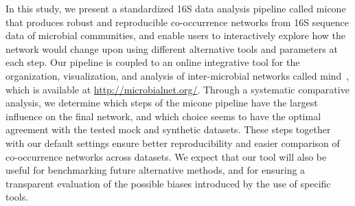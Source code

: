  In this study, we present a standardized 16S data analysis pipeline called \ac{micone} that produces robust and reproducible co-occurrence networks from 16S sequence data of microbial communities, and enable users to interactively explore how the network would change upon using different alternative tools and parameters at each step.
 Our pipeline is coupled to an online integrative tool for the organization, visualization, and analysis of inter-microbial networks called \ac{mind}~\cite{huResourceComparisonIntegration2022}, which is available at \href{http://microbialnet.org/}{http://microbialnet.org/}.
Through a systematic comparative analysis, we determine which steps of the \ac{micone} pipeline have the largest influence on the final network, and which choice seems to have the optimal agreement with the tested mock and synthetic datasets.
These steps together with our default settings ensure better reproducibility and easier comparison of co-occurrence networks across datasets.
We expect that our tool will also be useful for benchmarking future alternative methods, and for ensuring a transparent evaluation of the possible biases introduced by the use of specific tools.
